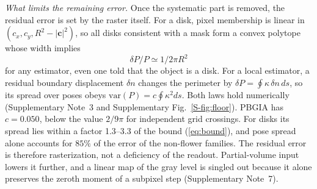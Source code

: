 \documentclass[11pt,a4paper]{article}
\begin{document}
\emph{What limits the remaining error.} Once the systematic part is removed, the residual error is set by the raster itself. For a disk, pixel membership is linear in $(c_x,c_y,R^2-|\bm c|^2)$, so all disks consistent with a mask form a convex polytope whose width implies
\begin{equation}
\delta P/P\simeq 1/2\pi R^2
\label{eq:bound}
\end{equation}
for any estimator, even one told that the object is a disk. For a local estimator, a residual boundary displacement $\delta n$ changes the perimeter by $\delta P=\oint\kappa\,\delta n\,ds$, so its spread over poses obeys $\mathrm{var}(P)=c\oint\kappa^2ds$. Both laws hold numerically (Supplementary Note~3 and Supplementary Fig.~\ref{S-fig:floor}). PBGIA has $c=0.050$, below the value $2/9\pi$ for independent grid crossings. For disks its spread lies within a factor 1.3--3.3 of the bound (\ref{eq:bound}), and pose spread alone accounts for $85\%$ of the error of the non-flower families. The residual error is therefore rasterization, not a deficiency of the readout. Partial-volume input lowers it further, and a linear map of the gray level is singled out because it alone preserves the zeroth moment of a subpixel step (Supplementary Note~7).
\end{document}
